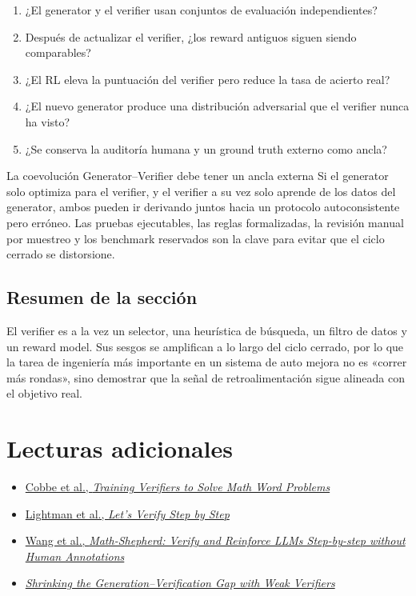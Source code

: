 \documentclass[a4paper]{article}
\begin{document}
\begin{enumerate}
    \item ¿El generator y el verifier usan conjuntos de evaluación independientes?
    \item Después de actualizar el verifier, ¿los reward antiguos siguen siendo comparables?
    \item ¿El RL eleva la puntuación del verifier pero reduce la tasa de acierto real?
    \item ¿El nuevo generator produce una distribución adversarial que el verifier nunca ha visto?
    \item ¿Se conserva la auditoría humana y un ground truth externo como ancla?
\end{enumerate}

\begin{importantbox}{La coevolución Generator--Verifier debe tener un ancla externa}
Si el generator solo optimiza para el verifier, y el verifier a su vez solo aprende de los datos del generator, ambos pueden ir derivando juntos hacia un protocolo autoconsistente pero erróneo. Las pruebas ejecutables, las reglas formalizadas, la revisión manual por muestreo y los benchmark reservados son la clave para evitar que el ciclo cerrado se distorsione.
\end{importantbox}

\subsection{Resumen de la sección}

El verifier es a la vez un selector, una heurística de búsqueda, un filtro de datos y un reward model. Sus sesgos se amplifican a lo largo del ciclo cerrado, por lo que la tarea de ingeniería más importante en un sistema de auto mejora no es «correr más rondas», sino demostrar que la señal de retroalimentación sigue alineada con el objetivo real.

\section{Lecturas adicionales}

\begin{itemize}
    \item \href{https://arxiv.org/abs/2110.14168}{Cobbe et al., \emph{Training Verifiers to Solve Math Word Problems}}
    \item \href{https://arxiv.org/abs/2305.20050}{Lightman et al., \emph{Let's Verify Step by Step}}
    \item \href{https://arxiv.org/abs/2312.08935}{Wang et al., \emph{Math-Shepherd: Verify and Reinforce LLMs Step-by-step without Human Annotations}}
    \item \href{https://arxiv.org/abs/2506.18203}{\emph{Shrinking the Generation--Verification Gap with Weak Verifiers}}
\end{itemize}
\end{document}
